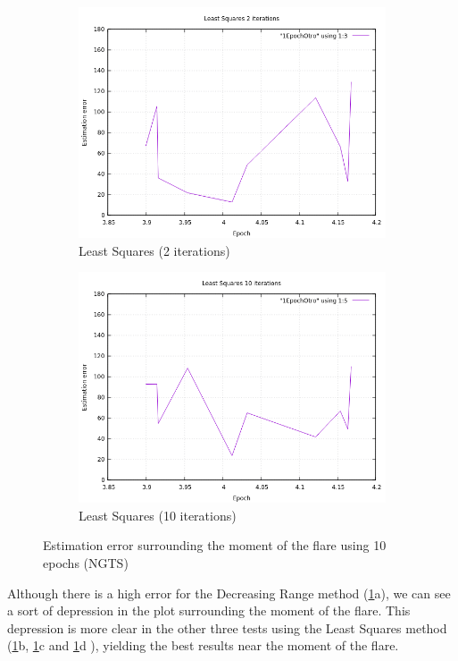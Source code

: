 \begin{figure}[!htb]
\begin{subfigure}[b]{0.5\textwidth}
		\includegraphics[width=\linewidth]{images/resultsStellar/10Epochs1Epoch/otro/1EpochLS2.png}
		\caption{Least Squares (2 iterations)}
	\end{subfigure}
	\hfill
	\begin{subfigure}[b]{0.5\textwidth}
		\includegraphics[width=\linewidth]{images/resultsStellar/10Epochs1Epoch/otro/1EpochLS10.png}
		\caption{Least Squares (10 iterations)}
	\end{subfigure}
	\caption{Estimation error surrounding the moment of the flare using 10 epochs (NGTS)}
	\label{fig:UL1Epoch10}
\end{figure}

Although there is a high error for the Decreasing Range method (\ref{fig:UL1Epoch10}a), we can see a sort of depression in the plot surrounding the moment of the flare. This depression is more clear in the other three tests using the Least Squares method (\ref{fig:UL1Epoch10}b, \ref{fig:UL1Epoch10}c and \ref{fig:UL1Epoch10}d ), yielding the best results near the moment of the flare.


